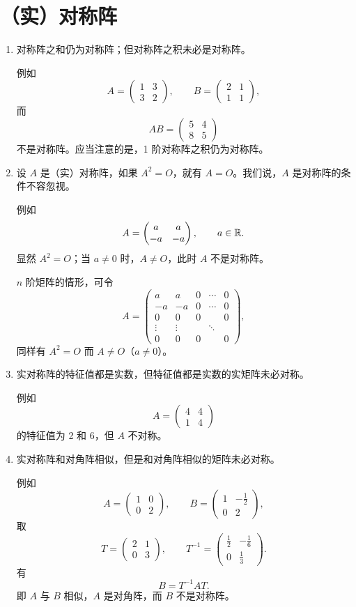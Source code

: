 \section{（实）对称阵}

\begin{enumerate}
\item 对称阵之和仍为对称阵；但对称阵之积未必是对称阵。

例如
\[
 A=\begin{pmatrix}1&3\\3&2\end{pmatrix},\qquad
 B=\begin{pmatrix}2&1\\1&1\end{pmatrix},
\]
而
\[
 AB=\begin{pmatrix}5&4\\8&5\end{pmatrix}
\]
不是对称阵。应当注意的是，1 阶对称阵之积仍为对称阵。

\item 设 $A$ 是（实）对称阵，如果 $A^2=O$，就有 $A=O$。我们说，$A$ 是对称阵的条件不容忽视。

例如
\[
 A=\begin{pmatrix}a&a\\-a&-a\end{pmatrix},\qquad a\in\mathbb{R}.
\]
显然 $A^2=O$；当 $a\ne0$ 时，$A\ne O$，此时 $A$ 不是对称阵。

$n$ 阶矩阵的情形，可令
\[
 A=\begin{pmatrix}
 a&a&0&\cdots&0\\
 -a&-a&0&\cdots&0\\
 0&0&0&&0\\
 \vdots&\vdots&&\ddots&\\
 0&0&0&&0
 \end{pmatrix},
\]
同样有 $A^2=O$ 而 $A\ne O$（$a\ne0$）。

\item 实对称阵的特征值都是实数，但特征值都是实数的实矩阵未必对称。

例如
\[
 A=\begin{pmatrix}4&4\\1&4\end{pmatrix}
\]
的特征值为 2 和 6，但 $A$ 不对称。

\item 实对称阵和对角阵相似，但是和对角阵相似的矩阵未必对称。

例如
\[
 A=\begin{pmatrix}1&0\\0&2\end{pmatrix},\qquad
 B=\begin{pmatrix}1&-\frac12\\0&2\end{pmatrix},
\]
取
\[
 T=\begin{pmatrix}2&1\\0&3\end{pmatrix},\qquad
 T^{-1}=\begin{pmatrix}\frac12&-\frac16\\0&\frac13\end{pmatrix}.
\]
有
\[
 B=T^{-1}AT.
\]
即 $A$ 与 $B$ 相似，$A$ 是对角阵，而 $B$ 不是对称阵。


\end{enumerate}
